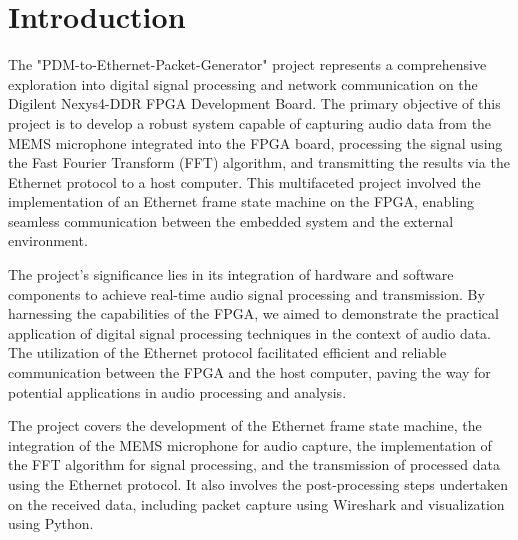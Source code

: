 \section{Introduction}

The "PDM-to-Ethernet-Packet-Generator" project represents a comprehensive exploration into digital signal processing and network communication on the Digilent Nexys4-DDR FPGA Development Board. The primary objective of this project is to develop a robust system capable of capturing audio data from the MEMS microphone integrated into the FPGA board, processing the signal using the Fast Fourier Transform (FFT) algorithm, and transmitting the results via the Ethernet protocol to a host computer. This multifaceted project involved the implementation of an Ethernet frame state machine on the FPGA, enabling seamless communication between the embedded system and the external environment.

The project's significance lies in its integration of hardware and software components to achieve real-time audio signal processing and transmission. By harnessing the capabilities of the FPGA, we aimed to demonstrate the practical application of digital signal processing techniques in the context of audio data. The utilization of the Ethernet protocol facilitated efficient and reliable communication between the FPGA and the host computer, paving the way for potential applications in audio processing and analysis.

The project covers the development of the Ethernet frame state machine, the integration of the MEMS microphone for audio capture, the implementation of the FFT algorithm for signal processing, and the transmission of processed data using the Ethernet protocol. It also involves the post-processing steps undertaken on the received data, including packet capture using Wireshark and visualization using Python. 


